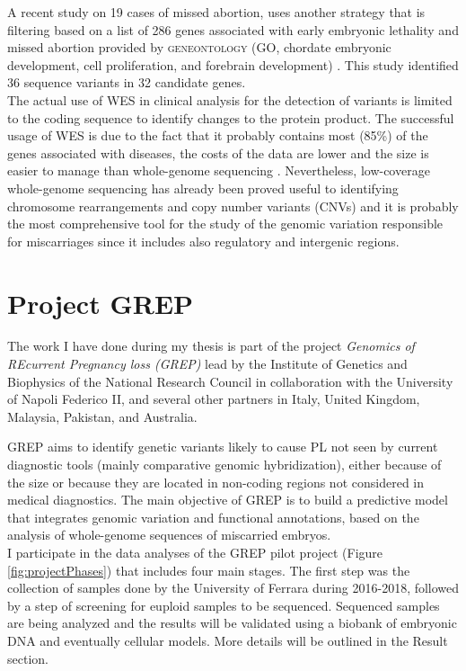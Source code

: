 A recent study on 19 cases of missed abortion, uses another strategy that is filtering based on a list of 286 genes associated with early embryonic lethality and missed abortion provided by \textsc{geneontology} (GO, chordate embryonic development, cell proliferation, and forebrain development) \cite{fu2018whole}. This study identified 36 sequence variants in 32 candidate genes.\\ 

The actual use of WES in clinical analysis for the detection of variants is limited to the coding sequence to identify changes to the protein product. The successful usage of WES is due to the fact that it probably contains most (85\%) of the genes associated with diseases, the costs of the data are lower and the size is easier to manage than whole-genome sequencing \cite{rabbani2014promise}. Nevertheless, low-coverage whole-genome sequencing has already been proved useful to identifying chromosome rearrangements and copy number variants (CNVs) \cite{rajcan2019next} and it is probably the most comprehensive tool for the study of the genomic variation responsible for miscarriages since it includes also regulatory and intergenic regions. \\


\section{Project GREP}
The work I have done during my thesis is part of the project \textit{Genomics of REcurrent Pregnancy loss (GREP)} lead by the Institute of Genetics and Biophysics of the National Research Council in collaboration with the University of Napoli Federico II, and several other partners in Italy, United Kingdom, Malaysia, Pakistan, and Australia.  

GREP aims to identify genetic variants likely to cause PL not seen by current diagnostic tools (mainly comparative genomic hybridization), either because of the size or because they are located in non-coding regions not considered in medical diagnostics. The main objective of GREP is to build a predictive model that integrates genomic variation and functional annotations, based on the analysis of whole-genome sequences of miscarried embryos.\\

I participate in the data analyses of the GREP pilot project (Figure \ref{fig:projectPhases}) that includes four main stages. The first step was the collection of samples done by the University of Ferrara during 2016-2018, followed by a step of screening for euploid samples to be sequenced. Sequenced samples are being analyzed and the results will be validated using a biobank of embryonic DNA and eventually cellular models. More details will be outlined in the Result section. 

